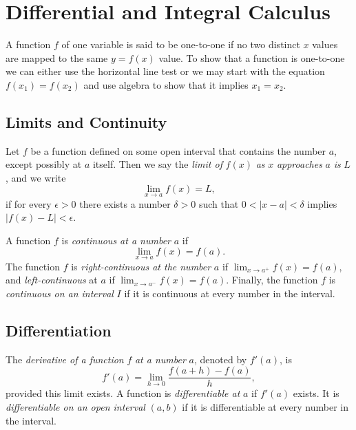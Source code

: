\documentclass[captions=tableheading]{scrbook}
\begin{document}
\section{Differential and Integral Calculus \label{sec:Differential-and-Integral}}
\label{sec-21-2}


A function \(f\) of one variable is said to be one-to-one if no two distinct \(x\) values are mapped to the same \(y=f(x)\) value. To show that a function is one-to-one we can either use the horizontal line test or we may start with the equation \(f(x_{1}) = f(x_{2})\) and use algebra to show that it implies \(x_{1} = x_{2}\).
\subsection{Limits and Continuity}
\label{sec-21-2-1}

\begin{defn}
Let \(f\) be a function defined on some open interval that contains the number \(a\), except possibly at \(a\) itself. Then we say the \emph{limit of} \(f(x)\) \emph{as} \(x\) \emph{approaches} \(a\) \emph{is} \(L\), and we write 
\begin{equation}
\lim_{x \to a}f(x) = L,
\end{equation}
if for every \(\epsilon > 0\) there exists a number \(\delta > 0\) such that \(0 < |x-a| < \delta\) implies \(|f(x) - L| < \epsilon\).
\end{defn}

\begin{defn}
A function \(f\) is \emph{continuous at a number} \(a\) if 
\begin{equation}
\lim_{x \to a} f(x) = f(a).
\end{equation}
The function \(f\) is \emph{right-continuous at the number} \(a\) if \(\lim_{x\to a^{+}}f(x)=f(a)\), and \emph{left-continuous} at \(a\) if \(\lim_{x\to a^{-}}f(x)=f(a)\). Finally, the function \(f\) is \emph{continuous on an interval} \(I\) if it is continuous at every number in the interval. 
\end{defn}
\subsection{Differentiation}
\label{sec-21-2-2}

\begin{defn}
The \emph{derivative of a function} \(f\) \emph{at a number} \(a\), denoted by \(f'(a)\), is
\begin{equation}
f'(a)=\lim_{h\to0}\frac{f(a+h)-f(a)}{h},
\end{equation}
provided this limit exists.
A function is \emph{differentiable at} \(a\) if \(f'(a)\) exists. It is \emph{differentiable on an open interval} \((a,b)\) if it is differentiable at every number in the interval.
\end{defn}
\end{document}
